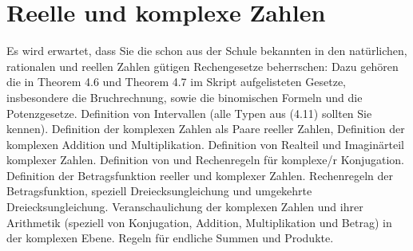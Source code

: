 \section{Reelle und komplexe Zahlen}
 
Es wird erwartet, dass Sie die schon aus der Schule bekannten in den natürlichen, rationalen und reellen Zahlen gütigen Rechengesetze beherrschen: Dazu gehören die in Theorem 4.6 und Theorem 4.7 im Skript aufgelisteten Gesetze, insbesondere die Bruchrechnung, sowie die binomischen Formeln und die Potenzgesetze. Definition von Intervallen (alle Typen aus (4.11) sollten Sie kennen). Definition der komplexen Zahlen als Paare reeller Zahlen, Definition der komplexen Addition und Multiplikation. Definition von Realteil und Imaginärteil komplexer Zahlen. Definition von und Rechenregeln für komplexe/r Konjugation. Definition der Betragsfunktion reeller und komplexer Zahlen. Rechenregeln der Betragsfunktion, speziell Dreiecksungleichung und umgekehrte Dreiecksungleichung. Veranschaulichung der komplexen Zahlen und ihrer Arithmetik (speziell von Konjugation, Addition, Multiplikation und Betrag) in der komplexen Ebene. Regeln für endliche Summen und Produkte. 
